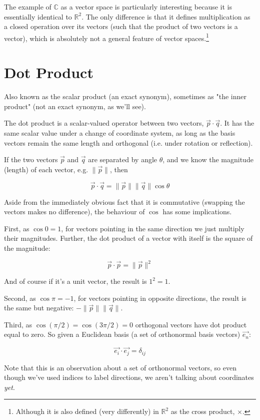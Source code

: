 The example of $\mathbb{C}$ as a vector space is particularly interesting because it is essentially identical to $\mathbb{R}^2$. The only difference is that it defines multiplication as a closed operation over its vectors (such that the product of two vectors is a vector), which is absolutely not a general feature of vector spaces.\footnote{Although it is also defined (very differently) in $\mathbb{R}^2$ as the cross product, $\times$.}

\section{Dot Product}

Also known as the scalar product (an exact synonym), sometimes as "the inner product" (not an exact synonym, as we'll see).

The dot product is a scalar-valued operator between two vectors, $\vec{p}\cdot\vec{q}$. It has the same scalar value under a change of coordinate system, as long as the basis vectors remain the same length and orthogonal (i.e. under rotation or reflection).

If the two vectors $\vec{p}$ and $\vec{q}$ are separated by angle $\theta$, and we know the magnitude (length) of each vector, e.g. $\|\vec{p}\|$, then

$$
\vec{p}\cdot\vec{q} =
\|\vec{p}\| \|\vec{q}\|\cos{\theta}
$$

Aside from the immediately obvious fact that it is commutative (swapping the vectors makes no difference), the behaviour of $\cos$ has some implications.

First, as $\cos{0} = 1$, for vectors pointing in the same direction we just multiply their magnitudes. Further, the dot product of a vector with itself is the square of the magnitude:

$$\vec{p}\cdot\vec{p} = \|\vec{p}\|^2$$

And of course if it's a unit vector, the result is $1^2 = 1$.

Second, as $\cos{\pi} = -1$, for vectors pointing in opposite directions, the result is the same but negative: $-\|\vec{p}\| \|\vec{q}\|$.

Third, as $\cos(\pi/2) = \cos(3\pi/2) = 0$ orthogonal vectors have dot product equal to zero. So given a Euclidean basis (a set of orthonormal basis vectors) $\vec{e_n}$:

$$\vec{e_i} \cdot \vec{e_j} = \delta_{ij} $$

Note that this is an observation about a set of orthonormal vectors, so even though we've used indices to label directions, we aren't talking about coordinates \textit{yet}.

